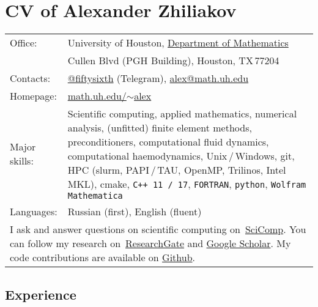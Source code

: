 \documentclass[a4paper,12pt]{article}
\begin{document}
	\section*{CV of Alexander Zhiliakov}
	
	\begin{longtable}{ l >{\raggedright\arraybackslash}p{15cm} }
		Office:			& University of Houston, \href{http://www.uh.edu/nsm/math/}{Department of Mathematics}\\
		\phantom{Summer 2018} & 3551 Cullen Blvd (PGH Building), Houston, TX\,77204\vspace{2mm}\\
		Contacts:		& \href{https://telegram.me/fiftysixth}{@fiftysixth} (Telegram), \href{mailto:alex@math.uh.edu}{alex@math.uh.edu}\vspace{2mm}\\
		Homepage:		& \href{https://www.math.uh.edu/~alex}{math.uh.edu/${\sim}$alex}\vspace{2mm}\\
		Major skills:	& Scientific computing, applied mathematics, numerical analysis, (unfitted) finite element methods, preconditioners, computational fluid dynamics, computational haemodynamics, Unix\,/\,Windows, git, HPC (slurm, PAPI\,/\,TAU, OpenMP, Trilinos, Intel MKL), cmake, \texttt{C++\,11\,/\,17}, \texttt{FORTRAN}, \texttt{python}, \texttt{Wolfram Mathematica}\vspace{2mm}\\
		Languages:		& Russian (first), English (fluent)\vspace{3mm}\\
		\multicolumn{2}{p{17cm}}{I ask and answer questions on scientific computing on~\href{https://scicomp.stackexchange.com/users/21916/56th}{SciComp}. You can follow my research on~\href{https://www.researchgate.net/profile/Alexander_Zhiliakov}{ResearchGate} and \href{https://scholar.google.com/citations?user=wchxEFUAAAAJ}{Google Scholar}. My code contributions are available on \href{https://github.com/56th}{Github}.}\\
	\end{longtable} 
	
	\subsection*{Experience}
	
\end{document}
